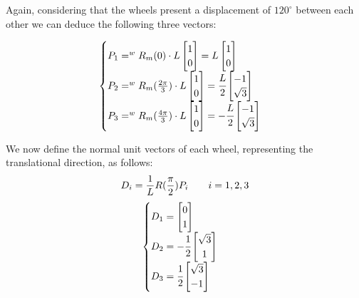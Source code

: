 Again, considering that the wheels present a displacement of $120^\circ$ between each other we can deduce the following three vectors:

\begin{equation}
\begin{cases} 
P_1 = 	
^wR_m(0)\cdot L
\begin{bmatrix}
1\\
0\\
\end{bmatrix} =
L
\begin{bmatrix}
1\\
0\\
\end{bmatrix}
\\ 
P_2 = 	
^wR_m(\frac{2\pi}{3})\cdot L
\begin{bmatrix}
1\\
0\\
\end{bmatrix} =
\cfrac{L}{2}
\begin{bmatrix}
-1\\
\sqrt{3}\\
\end{bmatrix}
\\ 
P_3 = 	
^wR_m(\frac{4\pi}{3})\cdot L
\begin{bmatrix}
1\\
0\\
\end{bmatrix} =
-\cfrac{L}{2}
\begin{bmatrix}
-1\\
\sqrt{3}\\
\end{bmatrix}
\\ 
\end{cases} 
\end{equation}

We now define the normal unit vectors of each wheel, representing the translational direction, as follows:
\begin{equation}
D_i =  \frac{1}{L}R(\frac{\pi}{2})P_i\qquad i=1,2,3 \\
\end{equation}
\begin{equation}
\begin{cases}
D_1 = \begin{bmatrix}0 \\ 1 \end{bmatrix} \\
D_2 = -\cfrac{1}{2}\begin{bmatrix}\sqrt{3} \\ 1 \end{bmatrix} \\
D_3 = \cfrac{1}{2}\begin{bmatrix}\sqrt{3} \\ -1 \end{bmatrix} \\
\end{cases}
\end{equation}

